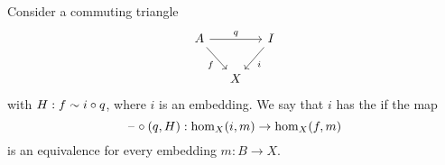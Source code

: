 \begin{defn}
Consider a commuting triangle
\begin{equation*}
\begin{tikzcd}[column sep=small]
A \arrow[rr,"q"] \arrow[dr,swap,"f"] & & I \arrow[dl,"i"] \\
& X
\end{tikzcd}
\end{equation*}
with $H:f\sim i\circ q$, where $i$ is an embedding.
We say that $i$ has the  if the map
\begin{equation*}
\mathord{\hspace{1pt}\text{--}\hspace{1pt}}\circ(q,H) : \mathrm{hom}_X(i,m)\to\mathrm{hom}_X(f,m)
\end{equation*}
is an equivalence for every embedding $m:B\to X$. 
\end{defn}

